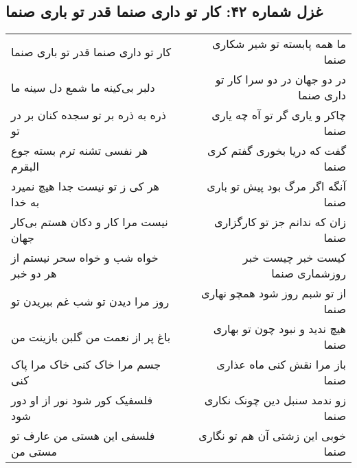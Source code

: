 \begin{center}
\section*{غزل شماره ۴۲: کار تو داری صنما قدر تو باری صنما}
\label{sec:0042}
\begin{longtable}{l p{0.5cm} r}
کار تو داری صنما قدر تو باری صنما
&&
ما همه پابسته تو شیر شکاری صنما
\\
دلبر بی‌کینه ما شمع دل سینه ما
&&
در دو جهان در دو سرا کار تو داری صنما
\\
ذره به ذره بر تو سجده کنان بر در تو
&&
چاکر و یاری گر تو آه چه یاری صنما
\\
هر نفسی تشنه ترم بسته جوع البقرم
&&
گفت که دریا بخوری گفتم کری صنما
\\
هر کی ز تو نیست جدا هیچ نمیرد به خدا
&&
آنگه اگر مرگ بود پیش تو باری صنما
\\
نیست مرا کار و دکان هستم بی‌کار جهان
&&
زان که ندانم جز تو کارگزاری صنما
\\
خواه شب و خواه سحر نیستم از هر دو خبر
&&
کیست خبر چیست خبر روزشماری صنما
\\
روز مرا دیدن تو شب غم ببریدن تو
&&
از تو شبم روز شود همچو نهاری صنما
\\
باغ پر از نعمت من گلبن بازینت من
&&
هیچ ندید و نبود چون تو بهاری صنما
\\
جسم مرا خاک کنی خاک مرا پاک کنی
&&
باز مرا نقش کنی ماه عذاری صنما
\\
فلسفیک کور شود نور از او دور شود
&&
زو ندمد سنبل دین چونک نکاری صنما
\\
فلسفی این هستی من عارف تو مستی من
&&
خوبی این زشتی آن هم تو نگاری صنما
\\
\end{longtable}
\end{center}
